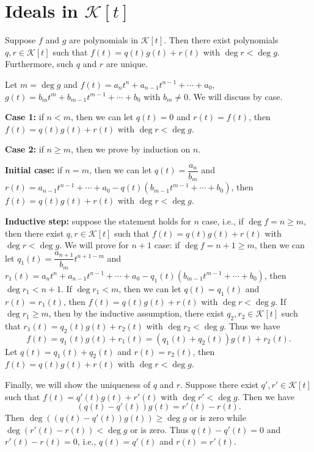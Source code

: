 \section{Ideals in $\mathcal K[t]$}
\begin{theoremenv}
    Suppose $f$ and $g$ are polynomials in $\mathcal K[t]$. Then there exist polynomials $q,r\in \mathcal K[t]$ such that $f(t) = q(t) g(t) + r(t)$ with $\deg r < \deg g$. Furthermore, such $q$ and $r$ are unique.
\end{theoremenv}
\begin{proofenv}
    Let $m = \deg g$ and $f(t) = a_n t^n + a_{n-1} t^{n-1} + \cdots + a_0$, $g(t) = b_m t^m + b_{m-1} t^{m-1} + \cdots + b_0$ with $b_m \ne 0$. We will discuss by case.

    \textbf{Case 1:} if $n < m$, then we can let $q(t) = 0$ and $r(t) = f(t)$, then $f(t) = q(t) g(t) + r(t)$ with $\deg r < \deg g$.

    \textbf{Case 2:} if $n \ge m$, then we prove by induction on $n$.

    \textbf{Initial case:} if $n=m$, then we can let $q(t) = \dfrac{a_n}{b_m}$ and $r(t) = a_{n-1} t^{n-1} + \cdots + a_0 - q(t)(b_{m-1} t^{m-1} + \cdots + b_0)$, then $f(t) = q(t) g(t) + r(t)$ with $\deg r < \deg g$.

    \textbf{Inductive step:} suppose the statement holds for $n$ case, i.e., if $\deg f = n \ge m$, then there exist $q,r\in \mathcal K[t]$ such that $f(t) = q(t) g(t) + r(t)$ with $\deg r < \deg g$. We will prove for $n+1$ case: if $\deg f = n+1 \ge m$, then we can let $q_1(t) = \dfrac{a_{n+1}}{b_m} t^{n+1-m}$ and $r_1(t) = a_n t^n + a_{n-1} t^{n-1} + \cdots + a_0 - q_1(t)(b_{m-1} t^{m-1} + \cdots + b_0)$, then $\deg r_1 < n+1$. If $\deg r_1 < m$, then we can let $q(t) = q_1(t)$ and $r(t) = r_1(t)$, then $f(t) = q(t) g(t) + r(t)$ with $\deg r < \deg g$. If $\deg r_1 \ge m$, then by the inductive assumption, there exist $q_2, r_2\in \mathcal K[t]$ such that $r_1(t) = q_2(t) g(t) + r_2(t)$ with $\deg r_2 < \deg g$. Thus we have
    $$ f(t) = q_1(t) g(t) + r_1(t) = (q_1(t) + q_2(t)) g(t) + r_2(t). $$
    Let $q(t) = q_1(t) + q_2(t)$ and $r(t) = r_2(t)$, then $f(t) = q(t) g(t) + r(t)$ with $\deg r < \deg g$.

    Finally, we will show the uniqueness of $q$ and $r$. Suppose there exist $q', r' \in \mathcal K[t]$ such that $f(t) = q'(t) g(t) + r'(t)$ with $\deg r' < \deg g$. Then we have
    $$ (q(t) - q'(t)) g(t) = r'(t) - r(t). $$
    Then $\deg ((q(t) - q'(t)) g(t)) \ge \deg g$ or is zero while $\deg (r'(t) - r(t)) < \deg g$ or is zero. Thus $q(t) - q'(t) = 0$ and $r'(t) - r(t) = 0$, i.e., $q(t) = q'(t)$ and $r(t) = r'(t)$.
\end{proofenv}
